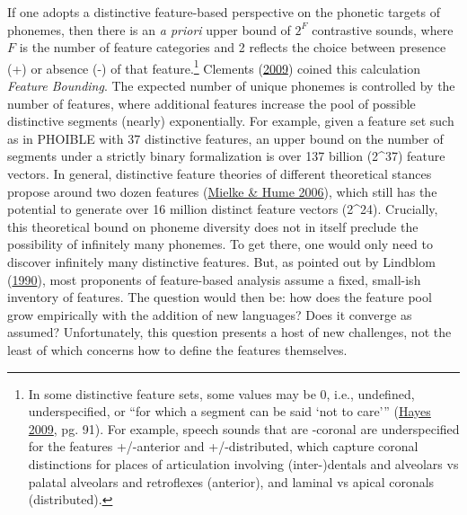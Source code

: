 \documentclass[
]{article}
\begin{document}
If one adopts a distinctive feature-based perspective on the phonetic
targets of phonemes, then there is an \emph{a priori} upper bound of
\(2^F\) contrastive sounds, where \(F\) is the number of feature
categories and 2 reflects the choice between presence (+) or absence (-)
of that feature.\footnote{In some distinctive feature sets, some values
  may be 0, i.e., undefined, underspecified, or ``for which a segment
  can be said `not to care''' (\protect\hyperlink{ref-Hayes2009}{Hayes
  2009}, pg. 91). For example, speech sounds that are -coronal are
  underspecified for the features +/-anterior and +/-distributed, which
  capture coronal distinctions for places of articulation involving
  (inter-)dentals and alveolars vs palatal alveolars and retroflexes
  (anterior), and laminal vs apical coronals (distributed).} Clements
(\protect\hyperlink{ref-Clements2009}{2009}) coined this calculation
\emph{Feature Bounding}. The expected number of unique phonemes is
controlled by the number of features, where additional features increase
the pool of possible distinctive segments (nearly) exponentially. For
example, given a feature set such as in PHOIBLE with 37 distinctive
features, an upper bound on the number of segments under a strictly
binary formalization is over 137 billion (2\^{}37) feature vectors. In
general, distinctive feature theories of different theoretical stances
propose around two dozen features
(\protect\hyperlink{ref-MielkeHume2006}{Mielke \& Hume 2006}), which
still has the potential to generate over 16 million distinct feature
vectors (2\^{}24). Crucially, this theoretical bound on phoneme
diversity does not in itself preclude the possibility of infinitely many
phonemes. To get there, one would only need to discover infinitely many
distinctive features. But, as pointed out by Lindblom
(\protect\hyperlink{ref-Lindblom1990a}{1990}), most proponents of
feature-based analysis assume a fixed, small-ish inventory of features.
The question would then be: how does the feature pool grow empirically
with the addition of new languages? Does it converge as assumed?
Unfortunately, this question presents a host of new challenges, not the
least of which concerns how to define the features themselves.
\end{document}

